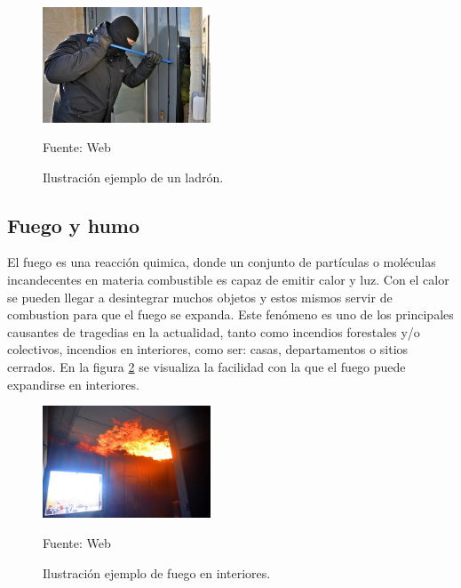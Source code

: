 \begin{figure}[H]
    \begin{center}
        \includegraphics[width=5cm]{img/capitulo_3/burglar.jpg}
    \end{center}
    \begin{center}
        \caption{Ilustración ejemplo de un ladrón.} 
        Fuente: Web
        \label{fig:ladron}
    \end{center}
\end{figure}

\subsection{Fuego y humo}
El fuego es una reacción quimica, donde un conjunto de partículas o moléculas incandecentes en materia combustible es capaz de emitir calor y luz. Con el calor se pueden llegar a desintegrar muchos objetos y estos mismos servir de combustion para que el fuego se expanda.
Este fenómeno es uno de los principales causantes de tragedias en la actualidad, tanto como incendios forestales y/o colectivos, incendios en interiores, como ser: casas, departamentos o sitios cerrados. En la figura \ref{fig:fuego} se visualiza la facilidad con la que el fuego puede expandirse en interiores.\\

\begin{figure}[H]
    \begin{center}
        \includegraphics[width=5cm]{img/capitulo_3/fuego_en_interiores.jpg}
    \end{center}
    \begin{center}
        \caption{Ilustración ejemplo de fuego en interiores.} 
        Fuente: Web 
        \label{fig:fuego}
    \end{center}
\end{figure}

